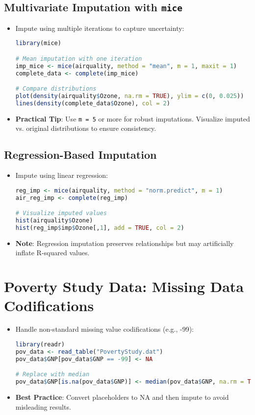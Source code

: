 \subsection{Multivariate Imputation with \texttt{mice}}
\begin{itemize}
    \item Impute using multiple iterations to capture uncertainty:
\begin{lstlisting}[language=R]
library(mice)

# Mean imputation with one iteration
imp_mice <- mice(airquality, method = "mean", m = 1, maxit = 1)
complete_data <- complete(imp_mice)

# Compare distributions
plot(density(airquality$Ozone, na.rm = TRUE), ylim = c(0, 0.025))
lines(density(complete_data$Ozone), col = 2)
\end{lstlisting}

\item \textbf{Practical Tip}: Use \texttt{m = 5} or more for robust imputations. Visualize imputed vs. original distributions to ensure consistency.
\end{itemize}

\subsection{Regression-Based Imputation}
\begin{itemize}
    \item Impute using linear regression:
\begin{lstlisting}[language=R]
reg_imp <- mice(airquality, method = "norm.predict", m = 1)
air_reg_imp <- complete(reg_imp)

# Visualize imputed values
hist(airquality$Ozone)
hist(reg_imp$imp$Ozone[,1], add = TRUE, col = 2)
\end{lstlisting}

\item \textbf{Note}: Regression imputation preserves relationships but may artificially inflate R-squared values.
\end{itemize}

\section{Poverty Study Data: Missing Data Codifications}
\begin{itemize}
    \item Handle non-standard missing value codifications (e.g., -99):
\begin{lstlisting}[language=R]
library(readr)
pov_data <- read_table("PovertyStudy.dat")
pov_data$GNP[pov_data$GNP == -99] <- NA

# Replace with median
pov_data$GNP[is.na(pov_data$GNP)] <- median(pov_data$GNP, na.rm = TRUE)
\end{lstlisting}

\item \textbf{Best Practice}: Convert placeholders to NA and then impute to avoid misleading results.
\end{itemize}


